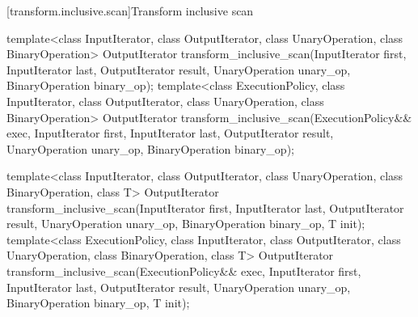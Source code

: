 [transform.inclusive.scan]{Transform inclusive scan}

%
\begin{itemdecl}
template<class InputIterator, class OutputIterator,
         class UnaryOperation,
         class BinaryOperation>
  OutputIterator transform_inclusive_scan(InputIterator first, InputIterator last,
                                          OutputIterator result,
                                          UnaryOperation unary_op,
                                          BinaryOperation binary_op);
template<class ExecutionPolicy, class InputIterator, class OutputIterator,
         class UnaryOperation,
         class BinaryOperation>
  OutputIterator transform_inclusive_scan(ExecutionPolicy&& exec,
                                          InputIterator first, InputIterator last,
                                          OutputIterator result,
                                          UnaryOperation unary_op,
                                          BinaryOperation binary_op);

template<class InputIterator, class OutputIterator,
         class UnaryOperation,
         class BinaryOperation, class T>
  OutputIterator transform_inclusive_scan(InputIterator first, InputIterator last,
                                          OutputIterator result,
                                          UnaryOperation unary_op,
                                          BinaryOperation binary_op, T init);
template<class ExecutionPolicy, class InputIterator, class OutputIterator,
         class UnaryOperation,
         class BinaryOperation, class T>
  OutputIterator transform_inclusive_scan(ExecutionPolicy&& exec,
                                          InputIterator first, InputIterator last,
                                          OutputIterator result,
                                          UnaryOperation unary_op,
                                          BinaryOperation binary_op, T init);
\end{itemdecl}

